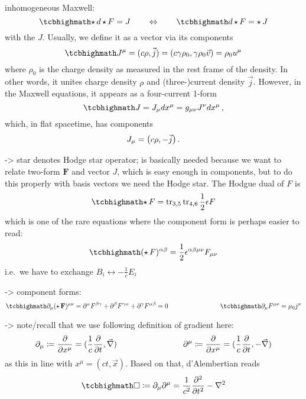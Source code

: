 \documentclass[../relativity_main.tex]{subfiles}
\begin{document}
inhomogeneous Maxwell:
\begin{equation}
	\eqbox{
		\hodge d \hodge F = J
	}
	\qquad \Leftrightarrow \qquad
	\eqbox{
		d \hodge F = \hodge J
	}
\end{equation}
with the  $J$. Usually, we define it as a vector via its components
\begin{equation}
	\eqbox{
		J^\mu = (c \rho, \vec{j}) = (c \gamma \rho_0, \gamma \rho_0 \vec{v}) = \rho_0 u^\mu
	}
\end{equation}
where $\rho_0$ is the charge density as measured in the rest frame of the density. In other words, it unites charge density $\rho$ and (three-)current density $\vec{j}$. However, in the Maxwell equations, it appears as a four-current 1-form
\begin{equation}
	\eqbox{
		J = J_\mu dx^\mu = g_{\mu \nu} J^\nu dx^\mu
	} \, ,
\end{equation}
which, in flat spacetime, has components
\begin{equation*}
	J_\mu = \mqty(c \rho, - \vec{j})
	\, .
\end{equation*}


-> star denotes Hodge star operator; is basically needed because we want to relate two-form $\mathbf{F}$ and vector $J$, which is easy enough in components, but to do this properly with basis vectors we need the Hodge star. The Hodgue dual of $F$ is
\begin{equation}
	\eqbox{
		\hodge F = \tr_{3, 5} \tr_{4, 6} \frac{1}{2} \epsilon F
	}
\end{equation}
which is one of the rare equations where the component form is perhaps easier to read:
\begin{equation}
	\eqbox{
		(\hodge F)^{\alpha \beta} = \frac{1}{2} \epsilon^{\alpha \beta \mu \nu} F_{\mu \nu}
	}
\end{equation}
i.e.~we have to exchange $B_i \leftrightarrow - \frac{1}{c} E_i$


-> component forms:
\begin{equation}
	\eqbox{
		\partial_\mu (\hodge \mathbf{F})^{\mu \nu} = \partial^\alpha F^{\beta \gamma} + \partial^\beta F^{\gamma \alpha} + \partial^\gamma F^{\alpha \beta} = 0
	}
	\manyqquad
	\eqbox{
		\partial_\mu F^{\mu \nu} = \mu_0 j^\nu
	}
\end{equation}


-> note/recall that we use following definition of gradient here:
\begin{equation}
	\partial_\mu \coloneqq \pdv{x^\mu} = (\frac{1}{c} \pdv{t}, \vec{\nabla})
	\qquad \qquad \qquad \qquad
	\partial^\mu \coloneqq \pdv{x^\mu} = (\frac{1}{c} \pdv{t}, - \vec{\nabla})
\end{equation}
as this in line with $x^\mu = (c t, \vec{x})$. Based on that, d'Alembertian reads
\begin{equation}
	\eqbox{
		\square \coloneqq \partial_\mu \partial^\mu = \frac{1}{c^2} \pdv[2]{t} - \laplacian
	}
\end{equation}
\end{document}
